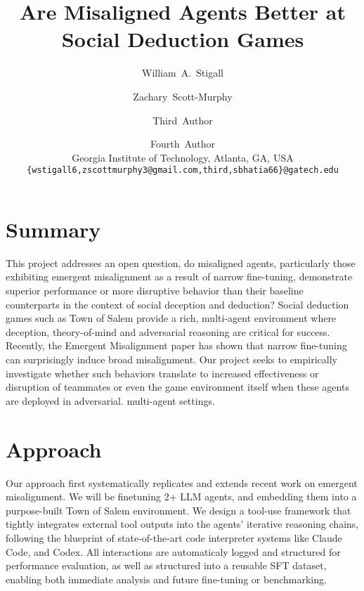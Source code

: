 \documentclass[10pt,onecolumn,letterpaper]{article}
\begin{document}
\title{Are Misaligned Agents Better at Social Deduction Games}

\author{
  William~A.~Stigall \and
  Zachary~Scott-Murphy \and
  Third~Author \and
  Fourth~Author \\[0.5em]
  Georgia Institute of Technology, Atlanta, GA, USA \\[0.25em]
  {\tt\small\{wstigall6,zscottmurphy3@gmail.com,third,sbhatia66\}@gatech.edu}
}




\maketitle


\section{Summary}
This project addresses an open question, do misaligned agents, particularly those exhibiting emergent misalignment as a result of narrow fine-tuning, demonstrate superior performance or more disruptive behavior than their baseline counterparts in the context of social deception and deduction? Social deduction games such as Town of Salem provide a rich, multi-agent environment where deception, theory-of-mind and adversarial reasoning are critical for success. Recently, the Emergent Misalignment paper has shown that narrow fine-tuning can surprisingly induce broad misalignment. Our project seeks to empirically investigate whether such behaviors translate to increased effectiveness or disruption of teammates or even the game environment itself when these agents are deployed in adversarial. multi-agent settings.
\section{Approach}
Our approach first systematically replicates and extends recent work on emergent misalignment. We will be finetuning 2+ LLM agents, and embedding them into a purpose-built Town of Salem environment. We design a tool-use framework that tightly integrates external tool outputs into the agents' iterative reasoning chains, following the blueprint of state-of-the-art code interpreter systems like Claude Code, and Codex. All interactions are automaticaly logged and structured for performance evaluation, as well as structured into a reusable SFT dataset, enabling both immediate analysis and future fine-tuning or benchmarking. 
\end{document}
